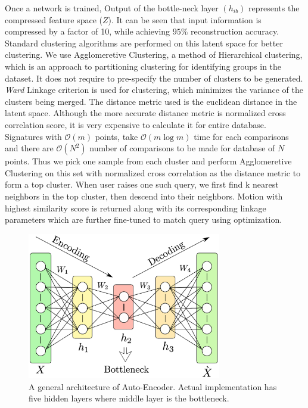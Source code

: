 \documentclass[twocolumn,10pt]{asme2ej}
\begin{document}
Once a network is trained, Output of the bottle-neck layer $(h_{ib})$ represents the compressed feature space ($Z$).
It can be seen that input information is compressed by a factor of 10, while achieving $95\%$ reconstruction accuracy.
Standard clustering algorithms are performed on this latent space for better clustering\cite{song2013}.
We use Agglomeretive Clustering, a method of Hierarchical clustering, which is an approach to partitioning clustering for identifying groups in the dataset.
It does not require to pre-specify the number of clusters to be generated.
\emph{Ward}\cite{ward1963} Linkage criterion is used for clustering, which minimizes the variance of the clusters being merged.
The distance metric used is the euclidean distance in the latent space.
Although the more accurate distance metric is normalized cross correlation score, it is very expensive to calculate it for entire database.
Signatures with $\mathcal{O}(m)$ points, take $\mathcal{O}(m\log{}m)$ time for each comparisons and there are $\mathcal{O}(N^2)$ number of comparisons to be made for database of $N$ points.
Thus we pick one sample from each cluster and perform Agglomeretive Clustering on this set with normalized cross correlation as the distance metric to form a top cluster.
When user raises one such query, we first find k nearest neighbors in the top cluster, then descend into their neighbors.
Motion with highest similarity score is returned along with its corresponding linkage parameters which are further fine-tuned to match query using optimization.

\begin{figure}
\centering
\includegraphics[width=240pt]{figure/fig_auto_encoder.eps}
  \caption{A general architecture of Auto-Encoder. Actual implementation has five hidden layers where middle layer is the bottleneck.}
\label{autoEncoder}
\end{figure}
\end{document}
